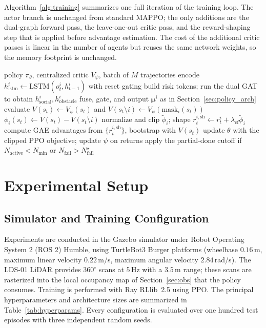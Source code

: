 \documentclass[journal,twoside,web]{ieeecolor}
\begin{document}
Algorithm~\ref{alg:training} summarizes one full iteration of the training loop. The actor branch is unchanged from standard MAPPO; the only additions are the dual-graph forward pass, the leave-one-out critic pass, and the reward-shaping step that is applied before advantage estimation. The cost of the additional critic passes is linear in the number of agents but reuses the same network weights, so the memory footprint is unchanged.

\begin{algorithm}[t]
\caption{Dual-graph counterfactual MAPPO (one iteration).}
\label{alg:training}
\begin{algorithmic}[1]
\REQUIRE policy $\pi_\theta$, centralized critic $V_\psi$, batch of $M$ trajectories
  \STATE encode $h_{\text{lstm}}^i\!\gets\!\mathrm{LSTM}(o_t^i,h_{t-1}^i)$ with reset gating
  \STATE build risk tokens; run the dual GAT to obtain $h_{\text{social}}^i,h_{\text{obstacle}}^i$
  \STATE fuse, gate, and output $\boldsymbol{\mu}^i$ as in Section~\ref{sec:policy_arch}
  \STATE evaluate $V(s_t)\!\gets\!V_\psi(s_t)$ and $V(s_t\!\setminus\!i)\!\gets\!V_\psi(\mathrm{mask}_i(s_t))$
  \STATE $\phi_i(s_t)\gets V(s_t)-V(s_t\!\setminus\!i)$
\ENDFOR
\STATE normalize and clip $\widetilde\phi_i$; shape $r_t^{i,\text{sh}}\!\gets\!r_t^i+\lambda_{\text{cf}}\widetilde\phi_i$
\STATE compute GAE advantages from $\{r_t^{i,\text{sh}}\}$, bootstrap with $V(s_t)$
\STATE update $\theta$ with the clipped PPO objective; update $\psi$ on returns
\STATE apply the partial-done cutoff if $N_{\text{active}}<N_{\min}$ or $N_{\text{fail}}>N_{\text{fail}}^\star$
\end{algorithmic}
\end{algorithm}


\section{Experimental Setup}
\label{sec:experiments}

\subsection{Simulator and Training Configuration}
\label{sec:setup_train}

Experiments are conducted in the Gazebo simulator under Robot Operating System 2 (ROS 2) Humble, using TurtleBot3 Burger platforms (wheelbase $0.16$\,m, maximum linear velocity $0.22$\,m/s, maximum angular velocity $2.84$\,rad/s). The LDS-01 LiDAR provides $360^\circ$ scans at $5$\,Hz with a $3.5$\,m range; these scans are rasterized into the local occupancy map of Section~\ref{sec:obs} that the policy consumes. Training is performed with Ray RLlib~2.5 using PPO. The principal hyperparameters and architecture sizes are summarized in Table~\ref{tab:hyperparams}. Every configuration is evaluated over one hundred test episodes with three independent random seeds.
\end{document}
